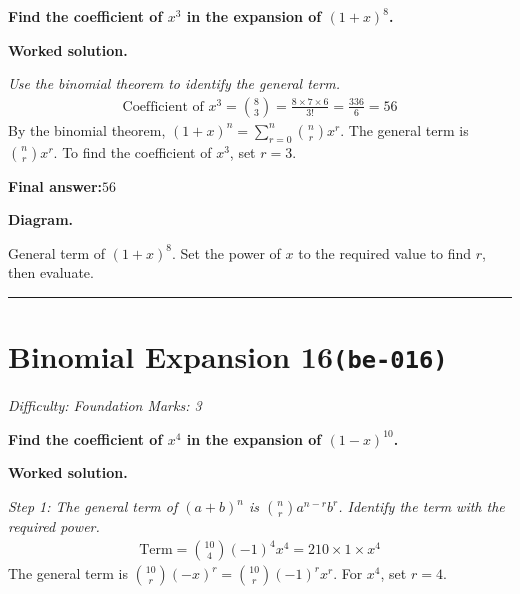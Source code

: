 \documentclass[11pt]{article}
\newcommand{\question}[1]{\par\medskip\noindent\textbf{#1}\par}
\begin{document}
\question{Find the coefficient of \( x^3 \) in the expansion of \( (1 + x)^8 \).}

\textbf{Worked solution.}

\textit{Use the binomial theorem to identify the general term.}
\[\begin{gathered}
\text{Coefficient of } x^3 = \binom{8}{3} = \frac{8 \times 7 \times 6}{3!} = \frac{336}{6} = 56
\end{gathered}\]
By the binomial theorem, \((1+x)^n = \sum_{r=0}^{n} \binom{n}{r} x^r\). The general term is \(\binom{n}{r} x^r\). To find the coefficient of \(x^3\), set \(r = 3\).

\begin{answerbox}
\textbf{Final answer:}\quad \(\displaystyle 56\)
\end{answerbox}
\textbf{Diagram.}

\begin{center}
\end{center}
\small General term of $\left(1+x\right)^{8}$. Set the power of $x$ to the required value to find $r$, then evaluate.\normalsize

\medskip\hrule

\section*{Binomial Expansion 16\quad\small\texttt{(be-016)}}
\textit{Difficulty: Foundation \quad\textbar\quad Marks: 3}

\question{Find the coefficient of \( x^4 \) in the expansion of \( (1 - x)^{10} \).}

\textbf{Worked solution.}

\textit{Step 1: The general term of \((a+b)^n\) is \(\binom{n}{r} a^{n-r} b^r\). Identify the term with the required power.}
\[\begin{gathered}
\text{Term} = \binom{10}{4}(-1)^4 x^4 = 210 \times 1 \times x^4
\end{gathered}\]
The general term is \( \binom{10}{r}(-x)^r = \binom{10}{r}(-1)^r x^r \). For \(x^4\), set \(r = 4\).
\end{document}
